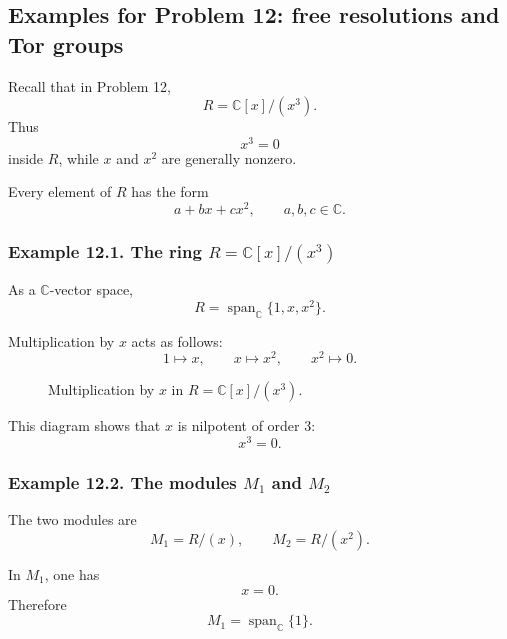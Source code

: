 \documentclass[12pt,a4paper]{article}
\theoremstyle{notespace}
\begin{document}
\subsection*{Examples for Problem 12: free resolutions and Tor groups}

Recall that in Problem 12,
\[
R=\mathbb C[x]/(x^3).
\]
Thus
\[
x^3=0
\]
inside \(R\), while \(x\) and \(x^2\) are generally nonzero.

Every element of \(R\) has the form
\[
a+bx+cx^2,
\qquad
a,b,c\in \mathbb C.
\]

\subsubsection*{Example 12.1. The ring \(R=\mathbb C[x]/(x^3)\)}

As a \(\mathbb C\)-vector space,
\[
R=\operatorname{span}_{\mathbb C}\{1,x,x^2\}.
\]

Multiplication by \(x\) acts as follows:
\[
1\mapsto x,
\qquad
x\mapsto x^2,
\qquad
x^2\mapsto 0.
\]

\begin{figure}[htbp]
	\centering
	\caption{Multiplication by \(x\) in \(R=\mathbb C[x]/(x^3)\).}
\end{figure}

This diagram shows that \(x\) is nilpotent of order \(3\):
\[
x^3=0.
\]

\subsubsection*{Example 12.2. The modules \(M_1\) and \(M_2\)}

The two modules are
\[
M_1=R/(x),
\qquad
M_2=R/(x^2).
\]

In \(M_1\), one has
\[
x=0.
\]
Therefore
\[
M_1=\operatorname{span}_{\mathbb C}\{1\}.
\]
\end{document}
